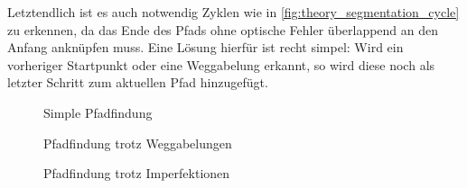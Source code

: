 Letztendlich ist es auch notwendig Zyklen wie in \autoref{fig:theory_segmentation_cycle} zu erkennen, da das Ende des Pfads ohne optische Fehler überlappend an den Anfang anknüpfen muss.
Eine Lösung hierfür ist recht simpel: Wird ein vorheriger Startpunkt oder eine Weggabelung erkannt, so wird diese noch als letzter Schritt zum aktuellen Pfad hinzugefügt.

\clearpage
\begin{figure}[!htbp]
    \begin{subfigure}[t]{0.45\textwidth}
        \centering
        
    \end{subfigure}
    \hfill
    \begin{subfigure}[t]{0.45\textwidth}
        \centering
        
    \end{subfigure}
    \caption[Simple Pfadfindung]{Simple Pfadfindung\protect\footnotemark}%
    \label{fig:theory_segmentation_simple}
\end{figure}
\begin{figure}[!htbp]
    \begin{subfigure}[t]{0.45\textwidth}
        \centering
        
    \end{subfigure}
    \hfill
    \begin{subfigure}[t]{0.45\textwidth}
        \centering
        
    \end{subfigure}
    \caption[Pfadfindung trotz Weggabelungen]{Pfadfindung trotz Weggabelungen\protect\footnotemark[\value{footnote}]}%
    \label{fig:theory_segmentation_intersection}
\end{figure}
\begin{figure}[!htbp]
    \begin{subfigure}[t]{0.45\textwidth}
        \centering
        
    \end{subfigure}
    \hfill
    \begin{subfigure}[t]{0.45\textwidth}
        \centering
        
    \end{subfigure}
    \caption[Pfadfindung trotz Imperfektionen]{Pfadfindung trotz Imperfektionen\protect\footnotemark[\value{footnote}]}%
    \label{fig:theory_segmentation_zhang_suen_steps}
\end{figure}
